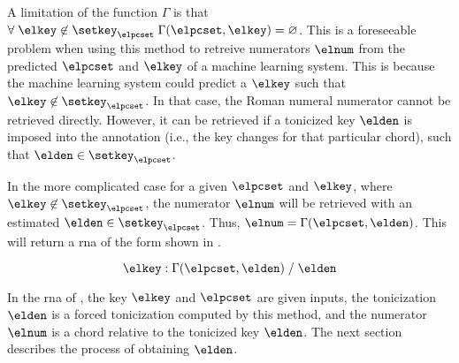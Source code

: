 A limitation of the function $\Gamma$ is that $\forall \;
\elkey \not\in \setkey_\elpcset \; \Gamma(\elpcset, \elkey)
= \varnothing$. This is a foreseeable problem when using
this method to retreive numerators $\elnum$ from the
predicted $\elpcset$ and $\elkey$ of a machine learning
system. This is because the machine learning system could
predict a $\elkey$ such that $\elkey \not\in
\setkey_\elpcset$. In that case, the Roman numeral numerator
cannot be retrieved directly. However, it can be retrieved
if a tonicized key $\elden$ is imposed into the annotation
(i.e., the key changes for that particular chord), such that
$\elden \in \setkey_\elpcset$.

In the more complicated case for a given $\elpcset$ and
$\elkey$, where $\elkey \not\in \setkey_\elpcset$, the
numerator $\elnum$ will be retrieved with an estimated
$\elden \in \setkey_\elpcset$. Thus, $\elnum =
\Gamma(\elpcset, \elden)$. This will return a \gls{rna} of
the form shown in .

\begin{equation}
    \label{eq:numerator_from_pcset_den}
    \elkey \; \text{:} \; \Gamma(\elpcset, \elden) \; \text{/} \; \elden
\end{equation}

In the \gls{rna} of , the
key $\elkey$ and $\elpcset$ are given inputs, the
tonicization $\elden$ is a forced tonicization computed by
this method, and the numerator $\elnum$ is a chord relative
to the tonicized key $\elden$. The next section describes
the process of obtaining $\elden$.
